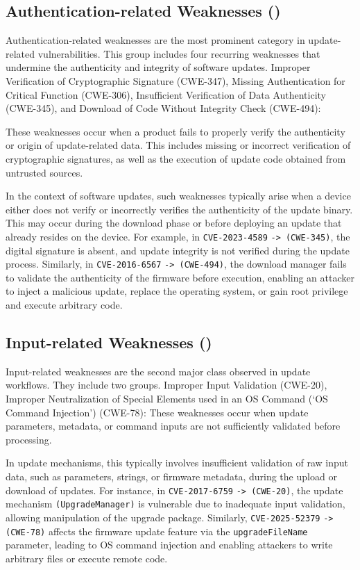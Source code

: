 \documentclass[fleqn,s1,names,tex]{neptune}
\begin{document}
\subsection{Authentication-related \?Weaknesses ({})}

Authentication-related weaknesses are the most prominent category in update-related vulnerabilities. 
This group includes four recurring weaknesses that undermine the authenticity and integrity of software updates.
Improper Verification of Cryptographic Signature (CWE-347),
Missing Authentication for Critical Function (CWE-306), 
Insufficient Verification of Data Authenticity (CWE-345),   and 
Download of Code Without Integrity Check (CWE-494):

These weaknesses occur when a product fails to properly verify the authenticity or origin of update-related data. 
This includes missing or incorrect verification of cryptographic signatures, as well as the execution of update code obtained from untrusted sources.


In the context of software updates, such weaknesses typically arise when a device either does not verify or incorrectly verifies the authenticity of the update binary. 
This may occur during the download phase or before deploying an update that already resides on the device.
For example, in \texttt{CVE-2023-4589} \texttt{-> (CWE-345)}, the digital signature is absent, and update integrity is not verified during the update process. 
Similarly, in \texttt{CVE-2016-6567} \texttt{-> (CWE-494)}, the download manager fails to validate the authenticity of the firmware before execution, enabling an attacker to inject a malicious update, replace the operating system, or gain root privilege and execute arbitrary code.


\subsection{Input-related \?Weaknesses  ({})}

Input-related weaknesses are the second major class observed in update workflows. 
They include two groups.
Improper Input  Validation (CWE-20), 
Improper Neutralization of Special Elements used in an OS Command (`OS Command Injection') (CWE-78):
These weaknesses occur when update parameters, metadata, or command inputs are not sufficiently validated before processing.


In update mechanisms, this typically involves insufficient validation of raw input data, such as parameters, strings, or firmware metadata, during the upload or download of updates. 
For instance, in \texttt{CVE-2017-6759} \texttt{-> (CWE-20)}, the update mechanism \texttt{(UpgradeManager)} is vulnerable due to inadequate input validation, allowing manipulation of the upgrade package. 
Similarly,  \texttt{CVE-2025-52379} \texttt{-> (CWE-78)} affects the firmware update feature via the \texttt{upgradeFileName} parameter, leading to OS command injection and enabling attackers to write arbitrary files or execute remote code.
\end{document}
